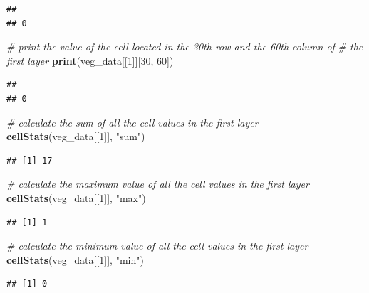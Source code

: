 \documentclass[12pt,]{book}
\newenvironment{Shaded}{\begin{snugshade}}{\end{snugshade}}
\newcommand{\KeywordTok}[1]{\textcolor[rgb]{0.13,0.29,0.53}{\textbf{#1}}}
\newcommand{\DecValTok}[1]{\textcolor[rgb]{0.00,0.00,0.81}{#1}}
\newcommand{\StringTok}[1]{\textcolor[rgb]{0.31,0.60,0.02}{#1}}
\newcommand{\CommentTok}[1]{\textcolor[rgb]{0.56,0.35,0.01}{\textit{#1}}}
\newcommand{\NormalTok}[1]{#1}
\begin{document}
\begin{verbatim}
##   
## 0
\end{verbatim}

\begin{Shaded}
\begin{Highlighting}[]
\CommentTok{# print the value of the cell located in the 30th row and the 60th column of}
\CommentTok{# the first layer}
\KeywordTok{print}\NormalTok{(veg_data[[}\DecValTok{1}\NormalTok{]][}\DecValTok{30}\NormalTok{, }\DecValTok{60}\NormalTok{])}
\end{Highlighting}
\end{Shaded}

\begin{verbatim}
##   
## 0
\end{verbatim}

\begin{Shaded}
\begin{Highlighting}[]
\CommentTok{# calculate the sum of all the cell values in the first layer}
\KeywordTok{cellStats}\NormalTok{(veg_data[[}\DecValTok{1}\NormalTok{]], }\StringTok{"sum"}\NormalTok{)}
\end{Highlighting}
\end{Shaded}

\begin{verbatim}
## [1] 17
\end{verbatim}

\begin{Shaded}
\begin{Highlighting}[]
\CommentTok{# calculate the maximum value of all the cell values in the first layer}
\KeywordTok{cellStats}\NormalTok{(veg_data[[}\DecValTok{1}\NormalTok{]], }\StringTok{"max"}\NormalTok{)}
\end{Highlighting}
\end{Shaded}

\begin{verbatim}
## [1] 1
\end{verbatim}

\begin{Shaded}
\begin{Highlighting}[]
\CommentTok{# calculate the minimum value of all the cell values in the first layer}
\KeywordTok{cellStats}\NormalTok{(veg_data[[}\DecValTok{1}\NormalTok{]], }\StringTok{"min"}\NormalTok{)}
\end{Highlighting}
\end{Shaded}

\begin{verbatim}
## [1] 0
\end{verbatim}
\end{document}
